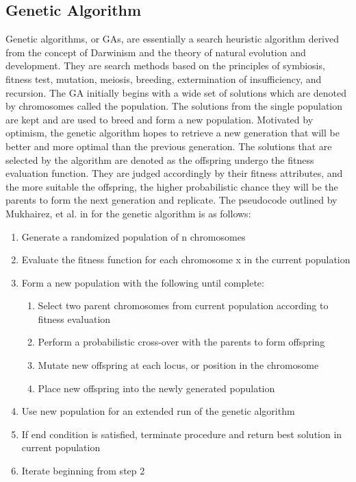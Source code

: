 \documentclass{article}
\begin{document}
\subsection{Genetic Algorithm}
Genetic algorithms, or GAs, are essentially a search heuristic algorithm derived from the concept of Darwinism and the theory of natural evolution and development. They are search methods based on the principles of symbiosis, fitness test, mutation, meiosis, breeding, extermination of insufficiency, and recursion. The GA initially begins with a wide set of solutions which are denoted by chromosomes called the population. The solutions from the single population are kept and are used to breed and form a new population. Motivated by optimism, the genetic algorithm hopes to retrieve a new generation that will be better and more optimal than the previous generation. The solutions that are selected by the algorithm are denoted as the offspring undergo the fitness evaluation function. They are judged accordingly by their fitness attributes, and the more suitable the offspring, the higher probabilistic chance they will be the parents to form the next generation and replicate. The pseudocode outlined by Mukhairez, et al. in \cite{Mukhairez} for the genetic algorithm is as follows: 

\begin{enumerate}
	\item Generate a randomized population of n chromosomes
	\item Evaluate the fitness function for each chromosome x in the current population
	\item Form a new population with the following until complete:
    \begin{enumerate}
    	\item Select two parent chromosomes from current population according to fitness evaluation
        \item Perform a probabilistic cross-over with the parents to form offspring
        \item Mutate new offspring at each locus, or position in the chromosome
        \item Place new offspring into the newly generated population
    \end{enumerate}
    \item Use new population for an extended run of the genetic algorithm
    \item If end condition is satisfied, terminate procedure and return best solution in current population
    \item Iterate beginning from step 2
\end{enumerate}
\end{document}
